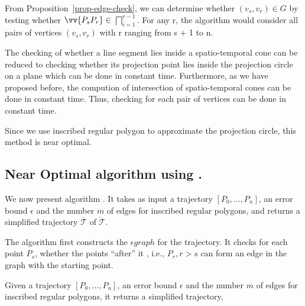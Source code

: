 From Proposition~\ref{prop-edge-check}, we can determine whether $(v_s,v_r) \in
G$ by testing whether $\vv{P_sP_r} \in $ $\bigsqcap_{i=1}^{r - 1}$. For any r, the algorithm would consider all
pairs of vertices  $(v_s,v_r)$ with  r ranging from s + 1 to n.  

The checking of whether a line segment lies inside a spatio-temporal cone can be
reduced to checking whether its projection point lies inside the projection
circle on a plane which can be done in constant time. Furthermore, as we have
proposed before, the compution of intersection of spatio-temporal cones can be
done in constant time. Thus, checking for each pair of vertices can be done in
constant time.

Since we use inscribed regular polygon to approximate the projection circle,
this method is near optimal.

\subsection{Near Optimal algorithm using \sed.}


We now present algorithm \cisto. It takes as input a trajectory ${[P_0, \ldots, P_n]}$, an error bound $\epsilon$ and the number $m$ of edges for inscribed regular polygons, and returns a simplified  trajectory $\overline{\mathcal{T}}$ of $\dddot{\mathcal{T}}$.

The algorithm first  constructs the $\epsilon graph$ for the trajectory. It
checks for each point $P_s$, whether the points ``after'' it , i.e., $P_r,r > s$
can form an edge in the graph with the starting point. 

Given a trajectory ${[P_0, \ldots, P_n]}$, an error bound $\epsilon$ and the number $m$ of edges for inscribed
regular polygons, it returns a simplified trajectory,


